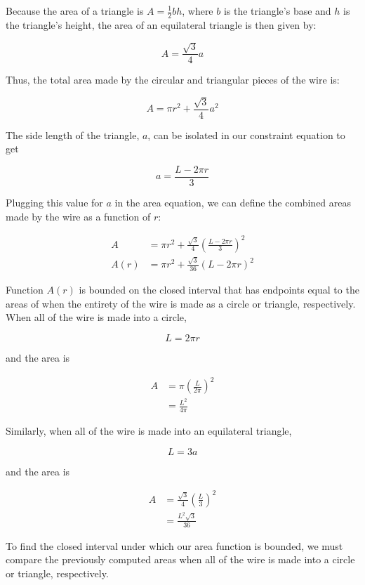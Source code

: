 \documentclass{article}
\begin{document}
    Because the area of a triangle is $A=\frac{1}{2}bh$, where $b$ is the triangle's base and $h$ is the triangle's height, the area of an equilateral triangle is then given by:

    \[
        A = \frac{\sqrt{3}}{4}a
    \]

    Thus, the total area made by the circular and triangular pieces of the wire is:

    \[
        A = \pi r^2 + \frac{\sqrt{3}}{4}a^2
    \]

    The side length of the triangle, $a$, can be isolated in our constraint equation to get

    \[
        a = \frac{L-2\pi r}{3}
    \]

    Plugging this value for $a$ in the area equation, we can define the combined areas made by the wire as a function of $r$:

    \begin{align*}
        A   &= \pi r^2 + \frac{\sqrt{3}}{4}\left(\frac{L-2\pi r}{3}\right)^2 \\
        A(r)&= \pi r^2 + \frac{\sqrt{3}}{36} (L-2\pi r)^2
    \end{align*}

    Function $A(r)$ is bounded on the closed interval that has endpoints equal to the areas of when the entirety of the wire is made as a circle or triangle, respectively. When all of the wire is made into a circle,

    \[
        L = 2\pi r
    \]

    and the area is

    \begin{align*}
        A   &= \pi \left(\frac{L}{2\pi}\right)^2 \\
            &= \frac{L^2}{4\pi}
    \end{align*}

    \pagebreak
    \thispagestyle{3}

    Similarly, when all of the wire is made into an equilateral triangle,

    \[
        L = 3a
    \]

    and the area is

    \begin{align*}
        A   &= \frac{\sqrt{3}}{4}\left(\frac{L}{3}\right)^2 \\
            &= \frac{L^2 \sqrt{3}}{36}
    \end{align*}

    To find the closed interval under which our area function is bounded, we must compare the previously computed areas when all of the wire is made into a circle or triangle, respectively. \\
\end{document}
